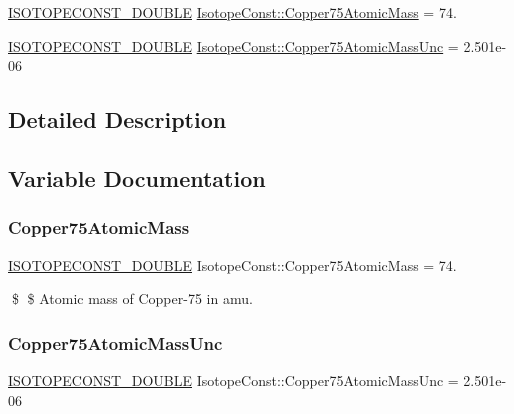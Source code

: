 \begin{DoxyCompactItemize}
\item 
\mbox{\hyperlink{group___isotope_const-_macros_ga8f45a7272ce02c0b4c65c44636ed719a}{I\+S\+O\+T\+O\+P\+E\+C\+O\+N\+S\+T\+\_\+\+D\+O\+U\+B\+LE}} \mbox{\hyperlink{group___isotope_const-_copper-_cu75_gab71fb558b0f61ab1796c0b9d3e7ebb90}{Isotope\+Const\+::\+Copper75\+Atomic\+Mass}} = 74.
\item 
\mbox{\hyperlink{group___isotope_const-_macros_ga8f45a7272ce02c0b4c65c44636ed719a}{I\+S\+O\+T\+O\+P\+E\+C\+O\+N\+S\+T\+\_\+\+D\+O\+U\+B\+LE}} \mbox{\hyperlink{group___isotope_const-_copper-_cu75_gafd49d954fcb3339604252a5f6209a530}{Isotope\+Const\+::\+Copper75\+Atomic\+Mass\+Unc}} = 2.\+501e-\/06
\end{DoxyCompactItemize}


\subsection{Detailed Description}


\subsection{Variable Documentation}
\mbox{\label{group___isotope_const-_copper-_cu75_gab71fb558b0f61ab1796c0b9d3e7ebb90}} 
\subsubsection{\texorpdfstring{Copper75\+Atomic\+Mass}{Copper75AtomicMass}}
{\footnotesize\ttfamily \mbox{\hyperlink{group___isotope_const-_macros_ga8f45a7272ce02c0b4c65c44636ed719a}{I\+S\+O\+T\+O\+P\+E\+C\+O\+N\+S\+T\+\_\+\+D\+O\+U\+B\+LE}} Isotope\+Const\+::\+Copper75\+Atomic\+Mass = 74.}

\$ \$ Atomic mass of Copper-\/75 in amu. \mbox{\label{group___isotope_const-_copper-_cu75_gafd49d954fcb3339604252a5f6209a530}} 
\subsubsection{\texorpdfstring{Copper75\+Atomic\+Mass\+Unc}{Copper75AtomicMassUnc}}
{\footnotesize\ttfamily \mbox{\hyperlink{group___isotope_const-_macros_ga8f45a7272ce02c0b4c65c44636ed719a}{I\+S\+O\+T\+O\+P\+E\+C\+O\+N\+S\+T\+\_\+\+D\+O\+U\+B\+LE}} Isotope\+Const\+::\+Copper75\+Atomic\+Mass\+Unc = 2.\+501e-\/06}

